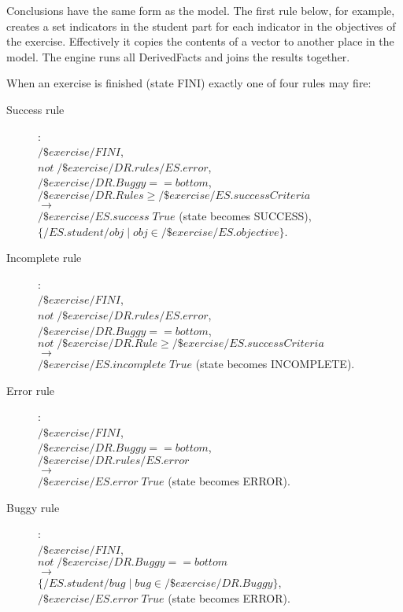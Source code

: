 Conclusions have the same form as the model.
The first rule below, for example, creates a set indicators in the student part for each indicator in the objectives of the exercise.
Effectively it copies the contents of a vector to another place in the model.
The engine runs all DerivedFacts and joins the results together.

When an exercise is finished (state FINI) exactly one of four rules may fire:

\begin{description}
\item[Success rule]:\\ 
$\mathit{/\$exercise/FINI}$,\\
$\mathit{not\; /\$exercise/DR.rules/ES.error}$, \\
$\mathit{/\$exercise/DR.Buggy == bottom}$,\\
$\mathit{/\$exercise/DR.Rules \geq /\$exercise/ES.successCriteria}$ \\
$\rightarrow$\\
$\mathit{/\$exercise/ES.success}\;\mathit{True}$ (state becomes SUCCESS),\\
$\mathit{\{/ES.student/obj} \; | \; \mathit{obj \in /\$exercise/ES.objective}\}$.

\item[Incomplete rule]:\\ 
$\mathit{/\$exercise/FINI}$,\\
$\mathit{not\; /\$exercise/DR.rules/ES.error}$,\\
$\mathit{/\$exercise/DR.Buggy == bottom}$,\\
$\mathit{not\; /\$exercise/DR.Rule \geq /\$exercise/ES.successCriteria}$ \\
$\rightarrow$\\
$\mathit{ /\$exercise/ES.incomplete \; True}$  (state becomes INCOMPLETE).

\item[Error rule]:\\ 
$\mathit{/\$exercise/FINI}$,\\
$\mathit{/\$exercise/DR.Buggy == bottom}$,\\
$\mathit{/\$exercise/DR.rules/ES.error}$ \\
$\rightarrow$\\
$\mathit{/\$exercise/ES.error\; True}$  (state becomes ERROR).

\item[Buggy  rule]:\\ 
$\mathit{/\$exercise/FINI}$,\\
$\mathit{not \; /\$exercise/DR.Buggy == bottom}$\\
$\rightarrow$\\
$\mathit{\{/ES.student/bug} \; | \;\mathit{bug \in /\$exercise/DR.Buggy }\}$,\\
$\mathit{/\$exercise/ES.error\; True}$  (state becomes ERROR).

\end{description}

